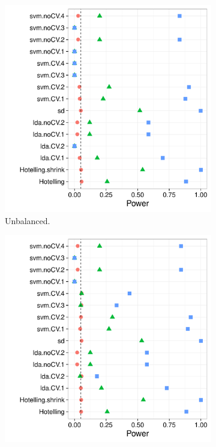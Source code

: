 \documentclass[12pt,a4paper]{article}
\begin{document}
\begin{figure}[h]
\centering
\caption{\footnotesize
The power of a permutation test with various test statistics. 
The power on the $x$ axis. 
Effect are color and shape coded. They are assumed to be equal in all the $23$ dimensions, and vary over $0$ (red circle), $0.25$ (green triangle), and $0.5$ (blue square). 
The various statistics on the $y$ axis. Their details are given in Table~\ref{tab:collected}. 
Simulation code available at [TODO].}	
\label{fig:simulation_1}
\begin{subfigure}{.5\textwidth}
\centering
\includegraphics[width=1\linewidth]{"art/2016-07-26 20:55:48"}
\caption{Unbalanced.}  %
\label{fig:simulation_11}
\end{subfigure}%
\begin{subfigure}{.5\textwidth}
\centering
\includegraphics[width=1\linewidth]{"art/2016-07-27 11:42:05"}

\end{subfigure}
\end{figure}
\end{document}
